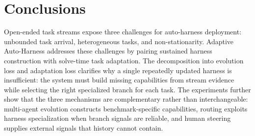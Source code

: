 
\section{Conclusions}
\label{sec:conclusions}
\vspace{-0.35em}

Open-ended task streams expose three challenges for auto-harness deployment: unbounded task arrival, heterogeneous tasks, and non-stationarity. Adaptive Auto-Harness addresses these challenges by pairing sustained harness construction with solve-time task adaptation. The decomposition into evolution loss and adaptation loss clarifies why a single repeatedly updated harness is insufficient: the system must build missing capabilities from stream evidence while selecting the right specialized branch for each task. The experiments further show that the three mechanisms are complementary rather than interchangeable: multi-agent evolution constructs benchmark-specific capabilities, routing exploits harness specialization when branch signals are reliable, and human steering supplies external signals that history cannot contain.

